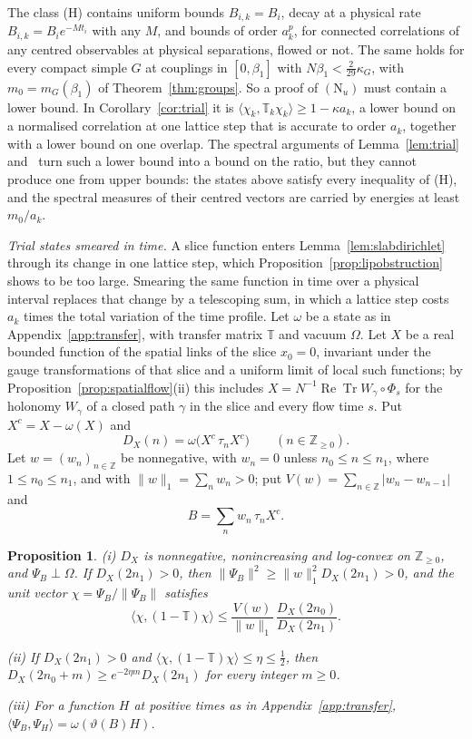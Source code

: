 \documentclass[aps,prd,twocolumn,superscriptaddress,nofootinbib,longbibliography,floatfix,amsmath,amssymb,10pt]{revtex4-2}
\newtheorem{proposition}[theorem]{Proposition}
\theoremstyle{definition}
\theoremstyle{remark}
\newcommand{\Z}{\mathbb{Z}}
\newcommand{\ReTr}{\operatorname{Re}\operatorname{Tr}}
\newcommand{\ip}[2]{\langle #1,#2\rangle}
\begin{document}
The class (H) contains uniform bounds $B_{i,k}=B_i$, decay at a physical
rate $B_{i,k}=B_ie^{-Mt_i}$ with any $M$, and bounds of order $a_k^p$, for
connected correlations of any centred observables at physical separations,
flowed or not. The same holds for every compact simple $G$ at couplings in
$[0,\beta_1]$ with $N\beta_1<\frac2{29}\kappa_G$, with $m_0=m_G(\beta_1)$ of
Theorem~\ref{thm:groups}. So a proof of $(\mathrm N_u)$ must contain a lower
bound. In Corollary~\ref{cor:trial} it is $\ip{\chi_k}{\mathbb T_k\chi_k}\ge
1-\kappa a_k$, a lower bound on a normalised correlation at one lattice step
that is accurate to order $a_k$, together with a lower bound on one overlap.
The spectral arguments of Lemma~\ref{lem:trial} and~\cite[Lemma~463]{BBLR26}
turn such a lower bound into a bound on the ratio, but they cannot produce one
from upper bounds: the states above satisfy every inequality of (H), and
the spectral measures of their centred vectors are carried by energies at
least $m_0/a_k$.

\emph{Trial states smeared in time.} A slice function enters
Lemma~\ref{lem:slabdirichlet} through its change in one lattice step, which
Proposition~\ref{prop:lipobstruction} shows to be too large. Smearing the
same function in time over a physical interval replaces that change by a
telescoping sum, in which a lattice step costs $a_k$ times the total
variation of the time profile. Let $\omega$ be a state as in
Appendix~\ref{app:transfer}, with transfer matrix $\mathbb T$ and vacuum
$\Omega$. Let $X$ be a real bounded function of the spatial links of the slice
$x_0=0$, invariant under the gauge transformations of that slice and a
uniform limit of local such functions; by
Proposition~\ref{prop:spatialflow}(ii) this includes $X=N^{-1}\ReTr
W_\gamma\circ\Phi_s$ for the holonomy $W_\gamma$ of a closed path $\gamma$
in the slice and every flow time $s$. Put $X^c=X-\omega(X)$ and
\[
D_X(n)=\omega\bigl(X^c\,\tau_nX^c\bigr)\qquad(n\in\Z_{\ge0}).
\]
Let $w=(w_n)_{n\in\Z}$ be nonnegative, with $w_n=0$ unless $n_0\le n\le n_1$,
where $1\le n_0\le n_1$, and with $\|w\|_1=\sum_nw_n>0$; put
$V(w)=\sum_{n\in\Z}|w_n-w_{n-1}|$ and
\[
B=\sum_nw_n\,\tau_nX^c .
\]

\begin{proposition}\label{prop:smearedtrial}
\textup{(i)} $D_X$ is nonnegative, nonincreasing and log-convex on
$\Z_{\ge0}$, and $\Psi_B\perp\Omega$. If $D_X(2n_1)>0$, then
$\|\Psi_B\|^2\ge\|w\|_1^2D_X(2n_1)>0$, and the unit vector
$\chi=\Psi_B/\|\Psi_B\|$ satisfies
\[
\ip\chi{(1-\mathbb T)\chi}\le\frac{V(w)}{\|w\|_1}\,
\frac{D_X(2n_0)}{D_X(2n_1)} .
\]

\textup{(ii)} If $D_X(2n_1)>0$ and $\ip\chi{(1-\mathbb T)\chi}\le\eta\le
\frac12$, then
$D_X(2n_0+m)\ge e^{-2\eta m}D_X(2n_1)$ for every integer $m\ge0$.

\textup{(iii)} For a function $H$ at positive times as in
Appendix~\textup{\ref{app:transfer}}, $\ip{\Psi_B}{\Psi_H}=
\omega(\vartheta(B)H)$.
\end{proposition}
\end{document}
